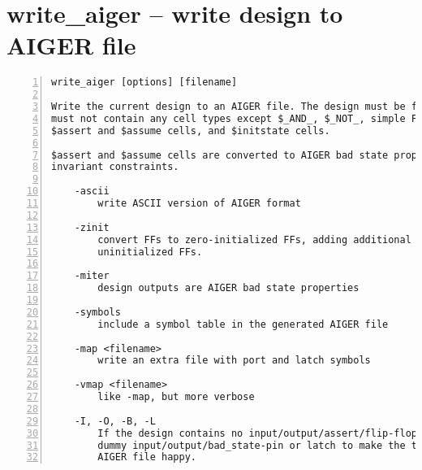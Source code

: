 \section{write\_aiger -- write design to AIGER file}
\label{cmd:write_aiger}
\begin{lstlisting}[numbers=left,frame=single]
    write_aiger [options] [filename]

Write the current design to an AIGER file. The design must be flattened and
must not contain any cell types except $_AND_, $_NOT_, simple FF types,
$assert and $assume cells, and $initstate cells.

$assert and $assume cells are converted to AIGER bad state properties and
invariant constraints.

    -ascii
        write ASCII version of AIGER format

    -zinit
        convert FFs to zero-initialized FFs, adding additional inputs for
        uninitialized FFs.

    -miter
        design outputs are AIGER bad state properties

    -symbols
        include a symbol table in the generated AIGER file

    -map <filename>
        write an extra file with port and latch symbols

    -vmap <filename>
        like -map, but more verbose

    -I, -O, -B, -L
        If the design contains no input/output/assert/flip-flop then create one
        dummy input/output/bad_state-pin or latch to make the tools reading the
        AIGER file happy.
\end{lstlisting}

